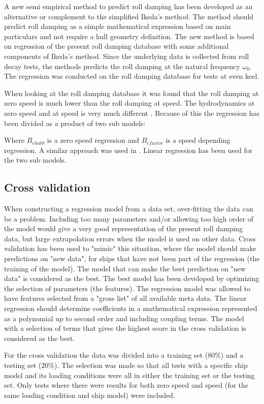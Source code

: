 A new semi empirical method to predict roll damping has been developed as an alternative or complement to the simplified Ikeda's method. The method should predict roll damping as a simple mathematical expression based on main particulars and not require a hull geometry definition. 
The new method is based on regression of the present roll damping database with some additional components of Ikeda's method. Since the underlying data is collected from roll decay tests, the methods predicts the roll damping at the natural frequency $\omega_0$.  
The regression was conducted on the roll damping database for tests at even keel. 

When looking at the roll damping database it was found that the roll damping at zero speed is much lower than the roll damping at speed. The hydrodynamics at zero speed and at speed is very much different \parencite{ikeda_velocity_1979}. Because of this the regression has been divided as a product of two sub models:

Where $B_{ehat0}$ is a zero speed regression and $B_{efactor}$ is a speed depending regression. A similar approach was used in \parencite{henry_peter_piehl_ship_2016}. Linear regression has been used for the two sub models. 

\subsection{Cross validation}
When constructing a regression model from a data set, over-fitting the data can be a problem. Including too many parameters and/or allowing too high order of the model would give a very good representation of the present roll damping data, but large extrapolation errors when the model is used on other data. Cross validation has been used to "mimic" this situation, where the model should make predictions on "new data", for ships that have not been part of the regression (the training of the model). The model that can make the best prediction on "new data" is considered as the best. The best model has been developed by optimizing the selection of parameters (the features). The regression model was allowed to have features selected from a "gross list" of all available meta data. The linear regression should determine coefficients in a mathematical expression represented as a polynomial up to second order and including coupling terms. The model with a selection of terms that gives the highest score in the cross validation is considered as the best.    

For the cross validation the data was divided into a  training set (80\%) and a testing set (20\%). The selection was made so that all tests with a specific ship model and its loading conditions were all in either the training set or the testing set. Only tests where there were results for both zero speed and speed (for the same loading condition and ship model) were included.

